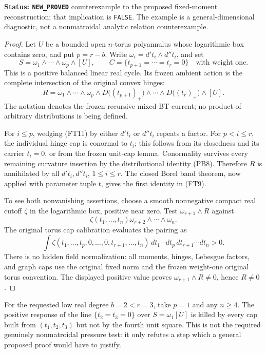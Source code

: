 \documentclass[11pt,a4paper]{article}
\numberwithin{equation}{section}
\theoremstyle{definition}
\theoremstyle{remark}
\begin{document}
\noindent\textbf{Status: \texttt{NEW\_PROVED}} counterexample
to the proposed fixed-moment reconstruction; that implication is
\texttt{FALSE}. The example is a general-dimensional diagnostic,
not a nonmatroidal analytic relation counterexample.

\begin{proof}
Let $U$ be a bounded open $n$-torus polyannulus whose logarithmic
box contains zero, and put $p=r-b$. Write
$\omega_i=d't_i\wedge d''t_i$, and set
\[
         S=\omega_1\wedge\cdots\wedge\omega_p\wedge[U],
         \qquad
         C=\{t_{p+1}=\cdots=t_r=0\}
              \quad\text{with weight one}.                         \tag{FT10}
\]
This is a positive balanced linear real cycle. Its frozen ambient
action is the complete intersection of the original convex hinges:
\[
     R=\omega_1\wedge\cdots\wedge\omega_p\wedge
               D\bigl((t_{p+1})_+\bigr)\wedge\cdots\wedge
               D\bigl((t_r)_+\bigr)\wedge[U].                      \tag{FT11}
\]
The notation denotes the frozen recursive mixed BT current;
no product of arbitrary distributions is being defined.

For $i\le p$, wedging (FT11) by either $d't_i$ or $d''t_i$ repeats
a factor. For $p<i\le r$, the individual hinge cap is conormal
to $t_i$; this follows from its closedness and its carrier
$t_i=0$, or from the frozen unit-cap lemma. Conormality survives
every remaining curvature insertion by the distributional identity
(PB8). Therefore $R$ is annihilated by all $d't_i,d''t_i$,
$1\le i\le r$. The closed Borel band theorem, now applied with
parameter tuple $t$, gives the first identity in (FT9).

To see both nonvanishing assertions, choose a smooth nonnegative
compact real cutoff $\zeta$ in the logarithmic box, positive near
zero. Test $\omega_{r+1}\wedge R$ against
\[
                        \zeta(t_1,\ldots,t_n)
                                  \omega_{r+2}\wedge\cdots\wedge\omega_n.
\]
The original torus cap calibration evaluates the pairing as
\[
       \int \zeta(t_1,\ldots,t_p,0,\ldots,0,t_{r+1},\ldots,t_n)
                  \,dt_1\cdots dt_p\,dt_{r+1}\cdots dt_n>0.        \tag{FT12}
\]
There is no hidden field normalization: all moments, hinges,
Lebesgue factors, and graph caps use the original fixed norm and
the frozen weight-one original torus convention. The displayed
positive value proves $\omega_{r+1}\wedge R\ne0$, hence $R\ne0$.
\end{proof}

For the requested low real degree $b=2<r=3$, take $p=1$ and any
$n\ge4$. The positive response of the line
$\{t_2=t_3=0\}$ over $S=\omega_1[U]$ is killed by every cap built
from $(t_1,t_2,t_3)$ but not by the fourth unit square. This is not
the required genuinely nonmatroidal pressure test: it only refutes
a step which a general proposed proof would have to justify.
\end{document}
